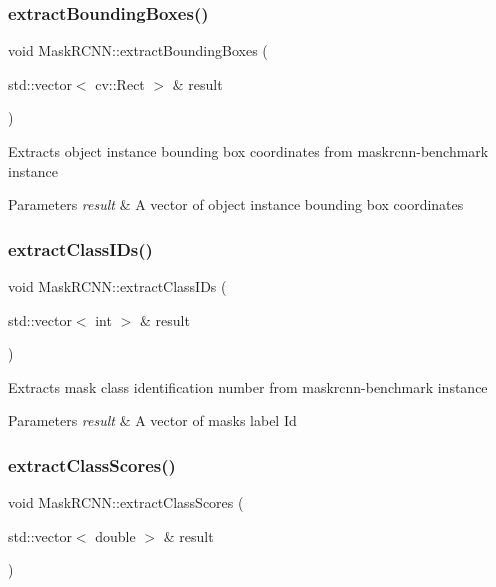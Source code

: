 \subsubsection{\texorpdfstring{extract\+Bounding\+Boxes()}{extractBoundingBoxes()}}
{\footnotesize\ttfamily void Mask\+R\+C\+N\+N\+::extract\+Bounding\+Boxes (\begin{DoxyParamCaption}\item[{std\+::vector$<$ cv\+::\+Rect $>$ \&}]{result }\end{DoxyParamCaption})}

Extracts object instance bounding box coordinates from maskrcnn-\/benchmark instance 
\begin{DoxyParams}{Parameters}
{\em result} & A vector of object instance bounding box coordinates \\
\hline
\end{DoxyParams}
\mbox{\label{classMaskRCNN_ad5c6a4317fbd032d5570ef672921d2b7}} 
\subsubsection{\texorpdfstring{extract\+Class\+I\+Ds()}{extractClassIDs()}}
{\footnotesize\ttfamily void Mask\+R\+C\+N\+N\+::extract\+Class\+I\+Ds (\begin{DoxyParamCaption}\item[{std\+::vector$<$ int $>$ \&}]{result }\end{DoxyParamCaption})}

Extracts mask class identification number from maskrcnn-\/benchmark instance 
\begin{DoxyParams}{Parameters}
{\em result} & A vector of masks label Id \\
\hline
\end{DoxyParams}
\mbox{\label{classMaskRCNN_af7c4acde0601ceb535d1ab7d79cf5825}} 
\subsubsection{\texorpdfstring{extract\+Class\+Scores()}{extractClassScores()}}
{\footnotesize\ttfamily void Mask\+R\+C\+N\+N\+::extract\+Class\+Scores (\begin{DoxyParamCaption}\item[{std\+::vector$<$ double $>$ \&}]{result }\end{DoxyParamCaption})}


